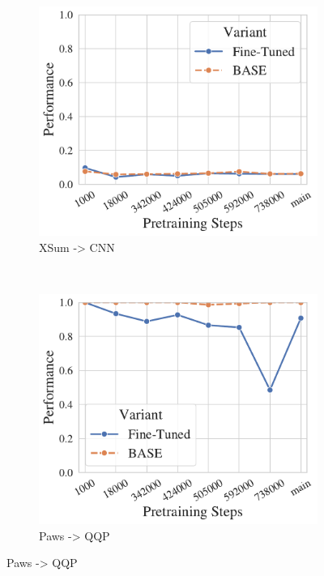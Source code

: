 \begin{figure}[t!]
    ~ 
    \begin{subfigure}[b]{0.25\textwidth}
    \includegraphics[width=\the\columnwidth]{figures/fig_files/ood/sft_evalcnn-trainxsum.pdf}
        \caption{XSum -> CNN}
    \end{subfigure}%
    \\
    \begin{subfigure}[b]{0.25\textwidth}
    \includegraphics[width=\the\columnwidth]{figures/fig_files/ood/sft_evalqqp-trainpaws.pdf}
        \caption{Paws -> QQP}
    \end{subfigure}%

\end{figure}

